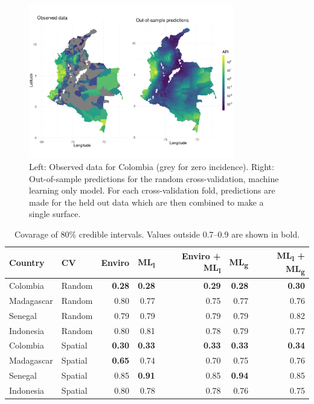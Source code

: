 \documentclass[11pt]{article}
\begin{document}
\begin{figure}
\centering
\includegraphics[trim={0 30mm 0 40mm}, width = 0.8\textwidth]{figs/col_obs_pred_map_ml.png} %
\caption{
  Left: Observed data for Colombia (grey for zero incidence). Right: Out-of-sample predictions for the random cross-validation, machine learning only model. For each cross-validation fold, predictions are made for the held out data which are then combined to make a single surface.
}
\label{f:map}
\end{figure}


\begin{table}[h!]
\caption{Covarage of 80\% credible intervals. Values outside 0.7--0.9 are shown in bold.}
\centering
\begin{tabular}{llrrrrr}
Country &  CV & Enviro & ML\textsubscript{l} &  Enviro + ML\textsubscript{l} & ML\textsubscript{g} & ML\textsubscript{l} + ML\textsubscript{g} \\
\hline 
 Colombia & Random & \textbf{0.28} & \textbf{0.28} & \textbf{0.29} & \textbf{0.28} & \textbf{0.30} \\
 Madagascar &  Random & 0.80 & 0.77& 0.75& 0.77& 0.76 \\
 Senegal & Random &0.79 & 0.79& 0.79& 0.79& 0.82 \\
 Indonesia & Random &0.80 & 0.81& 0.78& 0.79& 0.77  \\
 Colombia &  Spatial & \textbf{0.30} & \textbf{0.33}  & \textbf{0.33} & \textbf{0.33} & \textbf{0.34}  \\
 Madagascar & Spatial & \textbf{0.65} & 0.74& 0.70& 0.75 & 0.76   \\
 Senegal & Spatial & 0.85 & \textbf{0.91}& 0.85& \textbf{0.94} & 0.85  \\
  Indonesia & Spatial & 0.80 & 0.78& 0.78& 0.76& 0.75  \\
\end{tabular}
\label{t:coverage}
\end{table}
\end{document}
